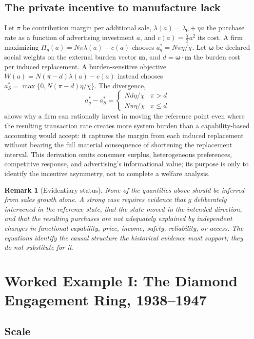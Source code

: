 \documentclass[11pt]{article}
\newtheorem{remark}[definition]{Remark}
\begin{document}
\subsection{The private incentive to manufacture lack}

Let $\pi$ be contribution margin per additional sale, $\lambda(a) = \lambda_0 + \eta a$ the purchase rate as a function of advertising investment $a$, and $c(a) = \tfrac{\chi}{2}a^2$ its cost. A firm maximizing $\Pi_g(a) = N\pi\lambda(a) - c(a)$ chooses $a_g^{*} = N\pi\eta/\chi$. Let $\boldsymbol{\omega}$ be declared social weights on the external burden vector $\mathbf{m}$, and $d = \boldsymbol{\omega}\cdot\mathbf{m}$ the burden cost per induced replacement. A burden-sensitive objective $W(a) = N(\pi - d)\lambda(a) - c(a)$ instead chooses $a_S^{*} = \max\{0, N(\pi-d)\eta/\chi\}$. The divergence,
\[
a_g^{*} - a_S^{*} = \begin{cases} Nd\eta/\chi & \pi > d \\ N\pi\eta/\chi & \pi \leq d \end{cases}
\]
shows why a firm can rationally invest in moving the reference point even where the resulting transaction rate creates more system burden than a capability-based accounting would accept: it captures the margin from each induced replacement without bearing the full material consequence of shortening the replacement interval. This derivation omits consumer surplus, heterogeneous preferences, competitive response, and advertising's informational value; its purpose is only to identify the incentive asymmetry, not to complete a welfare analysis.

\begin{remark}[Evidentiary status]
None of the quantities above should be inferred from sales growth alone. A strong case requires evidence that $g$ deliberately intervened in the reference state, that the state moved in the intended direction, and that the resulting purchases are not adequately explained by independent changes in functional capability, price, income, safety, reliability, or access. The equations identify the causal structure the historical evidence must support; they do not substitute for it.
\end{remark}

\section{Worked Example I: The Diamond Engagement Ring, 1938--1947}

\subsection{Scale}
\end{document}
